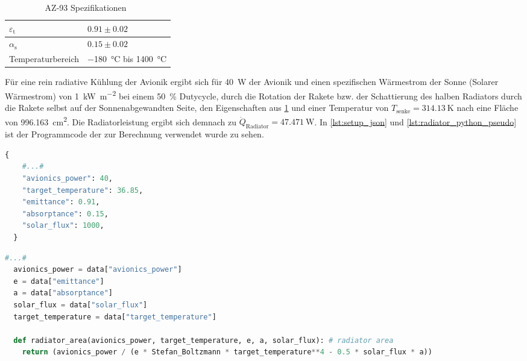 \begin{table}

  \centering
  \caption{AZ-93 Spezifikationen~\cite{AZ-Technology}}\label{tab:az-93_eigenschaften}

  \begin{tabular}{ll}

    \toprule[1pt]
    $\varepsilon_{\text{t}}$ & $0.91 \pm 0.02$ \\

    \midrule[0.5pt]
    $\alpha_{\text{s}}$ & $0.15 \pm 0.02$ \\

    \midrule[0.5pt]
    Temperaturbereich  & \SI{-180}{\degreeCelsius} bis \SI{1400}{\degreeCelsius} \\

    \bottomrule[1pt]
  \end{tabular}
\end{table}

Für eine rein radiative Kühlung der Avionik ergibt sich für \SI{40}{\watt} der Avionik und einen spezifischen Wärmestrom der Sonne (Solarer Wärmestrom) von \SI{1}{\kilo\watt\per\meter\squared}
bei einem \SI{50}{\percent} Dutycycle, durch die Rotation der Rakete bzw. der Schattierung des halben Radiators durch die Rakete selbst auf der Sonnenabgewandten Seite, den Eigenschaften aus
\ref{tab:az-93_eigenschaften} und einer Temperatur von $T_\mathrm{senke} = \SI{314,13}{\kelvin}$
nach eine Fläche von \SI{996,163}{\centi\meter\squared}. Die Radiatorleistung ergibt sich demnach zu $\dot{Q}_\mathrm{Radiator} = \SI{47.471}{\watt}$.
In \ref{lst:setup_json} und \ref{lst:radiator_python_pseudo} ist der Programmcode der zur Berechnung verwendet wurde zu sehen.

\begin{lstlisting}[float, language=python, caption={Setup Werte aus der setup.json}, label={lst:setup_json}]
  {
    #...#
    "avionics_power": 40,
    "target_temperature": 36.85,
    "emittance": 0.91,
    "absorptance": 0.15,
    "solar_flux": 1000,
  }
\end{lstlisting}

\begin{lstlisting}[float, language=Python, caption={Berechnung der Radiatorfläche in der radiator.py}, label={lst:radiator_python_pseudo}]
  #...#
  avionics_power = data["avionics_power"]
  e = data["emittance"]
  a = data["absorptance"]
  solar_flux = data["solar_flux"]
  target_temperature = data["target_temperature"]

  def radiator_area(avionics_power, target_temperature, e, a, solar_flux): # radiator area
    return (avionics_power / (e * Stefan_Boltzmann * target_temperature**4 - 0.5 * solar_flux * a))
\end{lstlisting}

